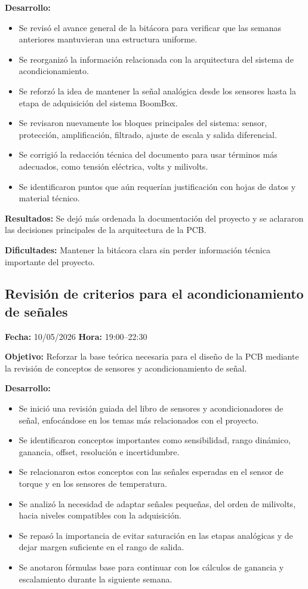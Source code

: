 \documentclass[12pt]{article}
\begin{document}
\textbf{Desarrollo:}
\begin{itemize}
\item Se revisó el avance general de la bitácora para verificar que las semanas anteriores mantuvieran una estructura uniforme.
\item Se reorganizó la información relacionada con la arquitectura del sistema de acondicionamiento.
\item Se reforzó la idea de mantener la señal analógica desde los sensores hasta la etapa de adquisición del sistema BoomBox.
\item Se revisaron nuevamente los bloques principales del sistema: sensor, protección, amplificación, filtrado, ajuste de escala y salida diferencial.
\item Se corrigió la redacción técnica del documento para usar términos más adecuados, como tensión eléctrica, volts y milivolts.
\item Se identificaron puntos que aún requerían justificación con hojas de datos y material técnico.
\end{itemize}

\textbf{Resultados:}
Se dejó más ordenada la documentación del proyecto y se aclararon las decisiones principales de la arquitectura de la PCB.

\textbf{Dificultades:}
Mantener la bitácora clara sin perder información técnica importante del proyecto.

\subsection{Revisión de criterios para el acondicionamiento de señales}
\textbf{Fecha:} 10/05/2026 \quad \textbf{Hora:} 19:00--22:30

\textbf{Objetivo:}
Reforzar la base teórica necesaria para el diseño de la PCB mediante la revisión de conceptos de sensores y acondicionamiento de señal.

\textbf{Desarrollo:}
\begin{itemize}
\item Se inició una revisión guiada del libro de sensores y acondicionadores de señal, enfocándose en los temas más relacionados con el proyecto.
\item Se identificaron conceptos importantes como sensibilidad, rango dinámico, ganancia, offset, resolución e incertidumbre.
\item Se relacionaron estos conceptos con las señales esperadas en el sensor de torque y en los sensores de temperatura.
\item Se analizó la necesidad de adaptar señales pequeñas, del orden de milivolts, hacia niveles compatibles con la adquisición.
\item Se repasó la importancia de evitar saturación en las etapas analógicas y de dejar margen suficiente en el rango de salida.
\item Se anotaron fórmulas base para continuar con los cálculos de ganancia y escalamiento durante la siguiente semana.
\end{itemize}
\end{document}
